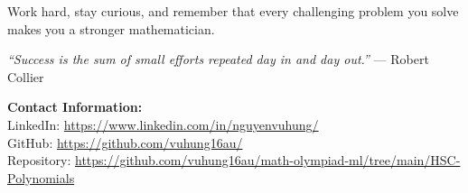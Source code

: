 \documentclass[12pt]{article}
\begin{document}
Work hard, stay curious, and remember that every challenging problem you solve makes you a stronger mathematician.

\textit{``Success is the sum of small efforts repeated day in and day out.''} --- Robert Collier

\vspace{2em}
\noindent\textbf{Contact Information:}\\[0.5em]
LinkedIn: \href{https://www.linkedin.com/in/nguyenvuhung/}{https://www.linkedin.com/in/nguyenvuhung/}\\[0.3em]
GitHub: \href{https://github.com/vuhung16au/}{https://github.com/vuhung16au/}\\[0.3em]
Repository: \href{https://github.com/vuhung16au/math-olympiad-ml/tree/main/HSC-Polynomials}{https://github.com/vuhung16au/math-olympiad-ml/tree/main/HSC-Polynomials}
\end{document}
